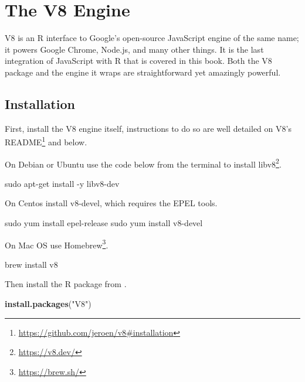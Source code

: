 \documentclass[10pt,]{krantz}
\makeatletter
\newenvironment{Shaded}{\begin{snugshade}}{\end{snugshade}}
\newcommand{\ExtensionTok}[1]{#1}
\newcommand{\FunctionTok}[1]{\textcolor[rgb]{0,0,0}{#1}}
\newcommand{\KeywordTok}[1]{\textcolor[rgb]{0.27,0.27,0.27}{\textbf{#1}}}
\newcommand{\NormalTok}[1]{#1}
\newcommand{\StringTok}[1]{\textcolor[rgb]{0.5,0.5,0.5}{#1}}
\renewcommand{\href}[2]{#2\footnote{\url{#1}}}
\newenvironment{kframe}{%
\medskip{}
\setlength{\fboxsep}{.8em}
 \def\at@end@of@kframe{}%
 \ifinner\ifhmode%
  \def\at@end@of@kframe{\end{minipage}}%
  \begin{minipage}{\columnwidth}%
 \fi\fi%
 \def\FrameCommand##1{\hskip\@totalleftmargin \hskip-\fboxsep
 \colorbox{shadecolor}{##1}\hskip-\fboxsep
     \hskip-\linewidth \hskip-\@totalleftmargin \hskip\columnwidth}%
 \MakeFramed {\advance\hsize-\width
   \@totalleftmargin\z@ \linewidth\hsize
   \@setminipage}}%
 {\par\unskip\endMakeFramed%
 \at@end@of@kframe}
\renewenvironment{Shaded}{\begin{kframe}}{\end{kframe}}
\makeatother
\begin{document}
\hypertarget{v8}{%
\chapter{The V8 Engine}\label{v8}}

V8 is an R interface to Google's open-source JavaScript engine of the same name; it powers Google Chrome, Node.js, and many other things. It is the last integration of JavaScript with R that is covered in this book. Both the V8 package and the engine it wraps are straightforward yet amazingly powerful.

\hypertarget{v8-installation}{%
\section{Installation}\label{v8-installation}}

First, install the V8 engine itself, instructions to do so are well detailed on \href{https://github.com/jeroen/v8\#installation}{V8's README} and below.

On Debian or Ubuntu use the code below from the terminal to install \href{https://v8.dev/}{libv8}.

\begin{Shaded}
\begin{Highlighting}[]
\FunctionTok{sudo}\NormalTok{ apt-get install -y libv8-dev}
\end{Highlighting}
\end{Shaded}

On Centos install v8-devel, which requires the EPEL tools.

\begin{Shaded}
\begin{Highlighting}[]
\FunctionTok{sudo}\NormalTok{ yum install epel-release}
\FunctionTok{sudo}\NormalTok{ yum install v8-devel}
\end{Highlighting}
\end{Shaded}

On Mac OS use \href{https://brew.sh/}{Homebrew}.

\begin{Shaded}
\begin{Highlighting}[]
\ExtensionTok{brew}\NormalTok{ install v8}
\end{Highlighting}
\end{Shaded}

Then install the R package from .

\begin{Shaded}
\begin{Highlighting}[]
\KeywordTok{install.packages}\NormalTok{(}\StringTok{"V8"}\NormalTok{)}
\end{Highlighting}
\end{Shaded}
\end{document}
